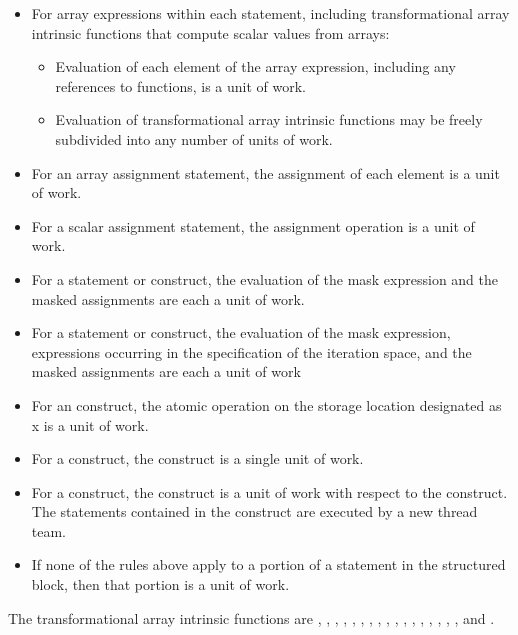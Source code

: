 \begin{itemize}
\item For array expressions within each statement, including transformational array 
intrinsic functions that compute scalar values from arrays:

\begin{itemize} %
\item Evaluation of each element of the array expression, including any references to 
 functions, is a unit of work.

\item Evaluation of transformational array intrinsic functions may be freely subdivided 
into any number of units of work.
\end{itemize}

\item For an array assignment statement, the assignment of each element is a unit of work.

\item For a scalar assignment statement, the assignment operation is a unit of work.

\item For a  statement or construct, the evaluation of the mask expression and the 
masked assignments are each a unit of work.

\item For a  statement or construct, the evaluation of the mask expression, 
expressions occurring in the specification of the iteration space, and the masked 
assignments are each a unit of work

\item For an  construct, the atomic operation on the storage location designated as 
x is a unit of work.

\item For a  construct, the construct is a single unit of work.

\item For a  construct, the construct is a unit of work with respect to the 
 construct. The statements contained in the  construct are 
executed by a new thread team.

\item If none of the rules above apply to a portion of a statement in the structured block, 
then that portion is a unit of work.
\end{itemize}

The transformational array intrinsic functions are , , , 
, , , , 
, , , , , 
, , , , , and .

